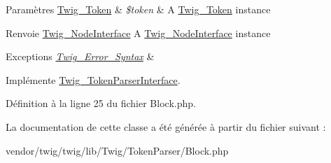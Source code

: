 \begin{DoxyParams}[1]{Paramètres}
\hyperlink{class_twig___token}{Twig\+\_\+\+Token} & {\em \$token} & A \hyperlink{class_twig___token}{Twig\+\_\+\+Token} instance\\
\hline
\end{DoxyParams}
\begin{DoxyReturn}{Renvoie}
\hyperlink{interface_twig___node_interface}{Twig\+\_\+\+Node\+Interface} A \hyperlink{interface_twig___node_interface}{Twig\+\_\+\+Node\+Interface} instance
\end{DoxyReturn}

\begin{DoxyExceptions}{Exceptions}
{\em \hyperlink{class_twig___error___syntax}{Twig\+\_\+\+Error\+\_\+\+Syntax}} & \\
\hline
\end{DoxyExceptions}


Implémente \hyperlink{interface_twig___token_parser_interface_a5dfa2e269321584fb74e8b43dabe0efd}{Twig\+\_\+\+Token\+Parser\+Interface}.



Définition à la ligne 25 du fichier Block.\+php.



La documentation de cette classe a été générée à partir du fichier suivant \+:\begin{DoxyCompactItemize}
\item 
vendor/twig/twig/lib/\+Twig/\+Token\+Parser/Block.\+php\end{DoxyCompactItemize}
